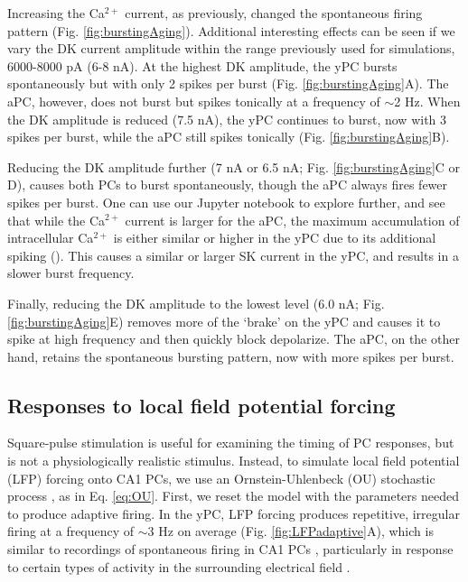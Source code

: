 \documentclass[10pt,letterpaper]{article}
\newcommand{\Ca}{Ca$^{2+}$}
\begin{document}
Increasing the {\Ca} current, as previously, changed the spontaneous firing pattern (Fig. \ref{fig:burstingAging}). Additional interesting effects can be seen if we vary the DK current amplitude within the range previously used for simulations, 6000-8000 pA (6-8 nA). At the highest DK amplitude, the yPC bursts spontaneously but with only 2 spikes per burst (Fig. \ref{fig:burstingAging}A). The aPC, however, does not burst but spikes tonically at a frequency of $\sim$2 Hz. When the DK amplitude is reduced (7.5 nA), the yPC continues to burst, now with 3 spikes per burst, while the aPC still spikes tonically (Fig. \ref{fig:burstingAging}B). 

Reducing the DK amplitude further (7 nA or 6.5 nA; Fig. \ref{fig:burstingAging}C or D), causes both PCs to burst spontaneously, though the aPC always fires fewer spikes per burst. One can use our Jupyter notebook to explore further, and see that while the {\Ca} current is larger for the aPC, the maximum accumulation of intracellular {\Ca} is either similar or higher in the yPC due to its additional spiking (). This causes a similar or larger SK current in the yPC, and results in a slower burst frequency.

Finally, reducing the DK amplitude to the lowest level (6.0 nA; Fig. \ref{fig:burstingAging}E) removes more of the `brake' on the yPC and causes it to spike at high frequency and then quickly block depolarize. The aPC, on the other hand, retains the spontaneous bursting pattern, now with more spikes per burst.

\subsection*{Responses to local field potential forcing}
Square-pulse stimulation is useful for examining the timing of PC responses, but is not a physiologically realistic stimulus. Instead, to simulate local field potential (LFP) forcing onto CA1 PCs, we use an Ornstein-Uhlenbeck (OU) stochastic process \cite{rudolph2004method,destexhe2004novel}, as in Eq. \ref{eq:OU}. First, we reset the model with the parameters needed to produce adaptive firing. In the yPC, LFP forcing produces repetitive, irregular firing at a frequency of $\sim$3 Hz on average (Fig. \ref{fig:LFPadaptive}A), which is similar to recordings of spontaneous firing in CA1 PCs \cite{manseau2017tuning}, particularly in response to certain types of activity in the surrounding electrical field \cite{bland2005heterogeneity,huh2016excitatory}.
\end{document}

